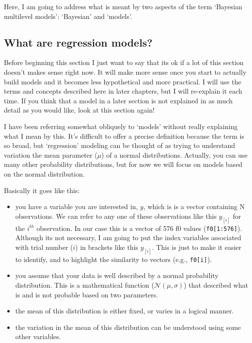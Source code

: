 \documentclass[
]{book}
\begin{document}
Here, I am going to address what is meant by two aspects of the term `Bayesian multilevel models': `Bayesian' and `models'.

\hypertarget{what-are-regression-models}{%
\subsection{What are regression models?}\label{what-are-regression-models}}

Before beginning this section I just want to say that its ok if a lot of this section doesn't makes sense right now. It will make more sense once you start to actually build models and it becomes less hypothetical and more practical. I will use the terms and concepts described here in later chapters, but I will re-explain it each time. If you think that a model in a later section is not explained in as much detail as you would like, look at this section again!

I have been referring somewhat obliquely to `models' without really explaining what I mean by this. It's difficult to offer a precise definition because the term is so broad, but `regression' modeling can be thought of as trying to understand variation the mean parameter (\(\mu\)) of a normal distributions. Actually, you can use many other probability distributions, but for now we will focus on models based on the normal distribution.

Basically it goes like this:

\begin{itemize}
\item
  you have a variable you are interested in, \(y\), which is is a vector containing N observations. We can refer to any one of these observations like this \(y_{[i]}\) for the \(i^{th}\) observation. In our case this is a vector of 576 f0 values (\texttt{f0{[}1:576{]}}). Although its not necessary, I am going to put the index variables associated with trial number (\(i\)) in brackets like this \(y_{[i]}\). This is just to make it easier to identify, and to highlight the similarity to vectors (e.g., \texttt{f0{[}i{]}}).
\item
  you assume that your data is well described by a normal probability distribution. This is a mathematical function (\(\mathcal{N}(\mu,\sigma)\)) that described what is and is not probable based on two parameters.
\item
  the mean of this distribution is either fixed, or varies in a logical manner.
\item
  the variation in the mean of this distribution can be understood using some other variables.
\end{itemize}
\end{document}
